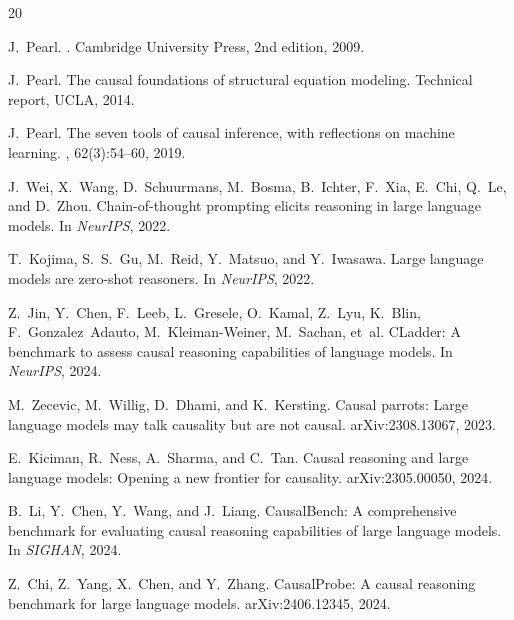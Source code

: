 \documentclass[11pt,a4paper]{article}
\begin{document}
\begin{thebibliography}{20}

J.~Pearl.
.
\newblock Cambridge University Press, 2nd edition, 2009.

J.~Pearl.
\newblock The causal foundations of structural equation modeling.
\newblock Technical report, UCLA, 2014.

J.~Pearl.
\newblock The seven tools of causal inference, with reflections on machine learning.
, 62(3):54--60, 2019.

J.~Wei, X.~Wang, D.~Schuurmans, M.~Bosma, B.~Ichter, F.~Xia, E.~Chi, Q.~Le, and D.~Zhou.
\newblock Chain-of-thought prompting elicits reasoning in large language models.
\newblock In {\em NeurIPS}, 2022.

T.~Kojima, S.~S.~Gu, M.~Reid, Y.~Matsuo, and Y.~Iwasawa.
\newblock Large language models are zero-shot reasoners.
\newblock In {\em NeurIPS}, 2022.

Z.~Jin, Y.~Chen, F.~Leeb, L.~Gresele, O.~Kamal, Z.~Lyu, K.~Blin, F.~Gonzalez~Adauto, M.~Kleiman-Weiner, M.~Sachan, et~al.
\newblock CLadder: A benchmark to assess causal reasoning capabilities of language models.
\newblock In {\em NeurIPS}, 2024.

M.~Zecevic, M.~Willig, D.~Dhami, and K.~Kersting.
\newblock Causal parrots: Large language models may talk causality but are not causal.
\newblock arXiv:2308.13067, 2023.

E.~Kiciman, R.~Ness, A.~Sharma, and C.~Tan.
\newblock Causal reasoning and large language models: Opening a new frontier for causality.
\newblock arXiv:2305.00050, 2024.

B.~Li, Y.~Chen, Y.~Wang, and J.~Liang.
\newblock CausalBench: A comprehensive benchmark for evaluating causal reasoning capabilities of large language models.
\newblock In {\em SIGHAN}, 2024.

Z.~Chi, Z.~Yang, X.~Chen, and Y.~Zhang.
\newblock CausalProbe: A causal reasoning benchmark for large language models.
\newblock arXiv:2406.12345, 2024.


\end{thebibliography}
\end{document}

